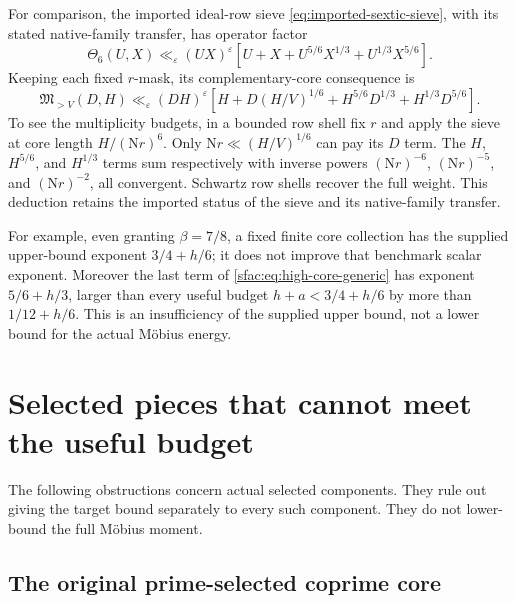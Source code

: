 \documentclass[11pt]{article}
\numberwithin{equation}{section}
\theoremstyle{definition}
\theoremstyle{remark}
\newcommand{\N}{\mathrm N}
\begin{document}
For comparison, the imported ideal-row sieve
\eqref{eq:imported-sextic-sieve}, with its stated native-family transfer,
has operator factor
\[
 \Theta_6(U,X)\ll_\varepsilon(UX)^\varepsilon
   [U+X+U^{5/6}X^{1/3}+U^{1/3}X^{5/6}].
\]
Keeping each fixed $r$-mask, its complementary-core consequence is
\begin{equation}
 \mathfrak M_{>V}(D,H)\ll_\varepsilon(DH)^\varepsilon
 \left[H+D(H/V)^{1/6}
          +H^{5/6}D^{1/3}+H^{1/3}D^{5/6}\right].
 \label{sfac:eq:high-core-generic}
\end{equation}
To see the multiplicity budgets, in a bounded row shell fix $r$ and
apply the sieve at core length $H/(\N r)^6$.  Only
$\N r\ll(H/V)^{1/6}$ can pay its $D$ term.  The $H$, $H^{5/6}$,
and $H^{1/3}$ terms sum respectively with inverse powers
$(\N r)^{-6}$, $(\N r)^{-5}$, and $(\N r)^{-2}$, all convergent.
Schwartz row shells recover the full weight.  This deduction retains
the imported status of the sieve and its native-family transfer.

For example, even granting $\beta=7/8$, a fixed finite core collection
has the supplied upper-bound exponent $3/4+h/6$; it does not improve
that benchmark scalar exponent.  Moreover the last term of
\eqref{sfac:eq:high-core-generic} has exponent $5/6+h/3$, larger
than every useful budget $h+a<3/4+h/6$ by more than
$1/12+h/6$.  This is an insufficiency of the supplied upper bound,
not a lower bound for the actual Möbius energy.



\section{Selected pieces that cannot meet the useful budget}
\label{sec:obstructions}

The following obstructions concern actual selected components.
They rule out giving the target bound separately to every such
component. They do not lower-bound the full M\"obius moment.

\subsection{The original prime-selected coprime core}
\end{document}
